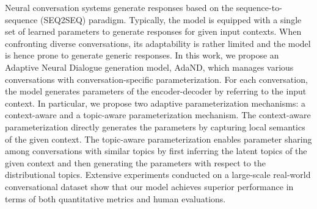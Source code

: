 Neural conversation systems generate responses based on the sequence-to-sequence (SEQ2SEQ) paradigm.
 Typically, the model is equipped with a single set of learned parameters to generate responses for given input contexts. 
 When confronting diverse conversations, its adaptability is rather limited and the model is hence prone to generate generic responses.
 In this work, we propose an Adaptive Neural Dialogue generation model, AdaND, which manages various conversations with conversation-specific parameterization.
 For each conversation, the model generates parameters of the encoder-decoder by referring to the input context.
 In particular, we propose two adaptive parameterization mechanisms: a context-aware and a topic-aware parameterization mechanism.
 The context-aware parameterization directly generates the parameters by capturing local semantics of the given context.
 The topic-aware parameterization enables parameter sharing among conversations with similar topics by first inferring the latent topics of the given context and then generating the parameters with respect to the distributional topics.
 Extensive experiments conducted on a large-scale real-world conversational dataset show that our model achieves superior performance in terms of both quantitative metrics and human evaluations.